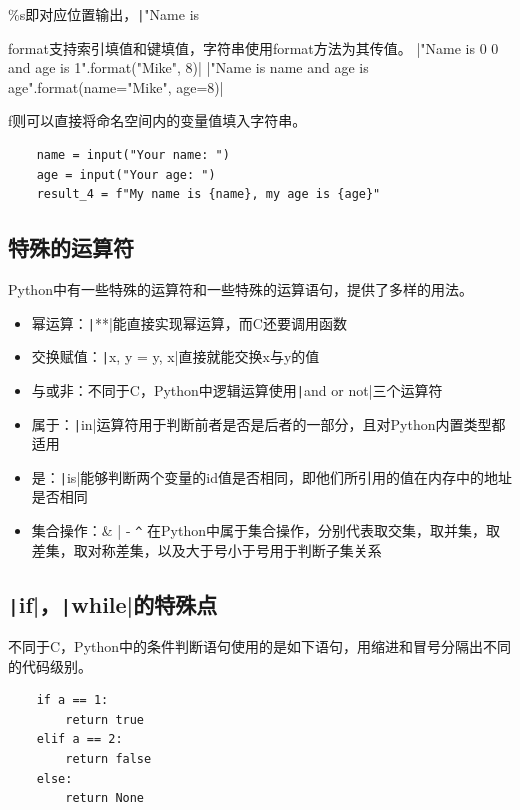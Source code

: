 \documentclass[fontset=ubuntu]{ctexart}
\begin{document}
\%s即对应位置输出，\texttt|"Name is %

format支持索引填值和键填值，字符串使用format方法为其传值。
|"Name is {0} {0} and age is {1}".format("Mike", 8)|
|"Name is {name} and age is {age}".format(name="Mike", age=8)|

f则可以直接将命名空间内的变量值填入字符串。
\begin{listing}[htb]
    \begin{verbatim}
    name = input("Your name: ")
    age = input("Your age: ")
    result_4 = f"My name is {name}, my age is {age}"
    \end{verbatim}
\end{listing}

\subsection{特殊的运算符}
Python中有一些特殊的运算符和一些特殊的运算语句，提供了多样的用法。
\begin{itemize}
    \item 幂运算：\texttt|**|能直接实现幂运算，而C还要调用函数
    \item 交换赋值：\texttt|x, y = y, x|直接就能交换x与y的值
    \item 与或非：不同于C，Python中逻辑运算使用\texttt|and or not|三个运算符
    \item 属于：\texttt|in|运算符用于判断前者是否是后者的一部分，且对Python内置类型都适用
    \item 是：\texttt|is|能够判断两个变量的id值是否相同，即他们所引用的值在内存中的地址是否相同
    \item 集合操作：\& | - \verb|^| 在Python中属于集合操作，分别代表取交集，取并集，取差集，取对称差集，以及大于号小于号用于判断子集关系
\end{itemize}

\subsection{\texttt|if|，\texttt|while|的特殊点}
不同于C，Python中的条件判断语句使用的是如下语句，用缩进和冒号分隔出不同的代码级别。
\begin{listing}[htb]
    \begin{verbatim}
    if a == 1:
        return true
    elif a == 2:
        return false
    else:
        return None
    \end{verbatim}
\end{listing}
\end{document}
